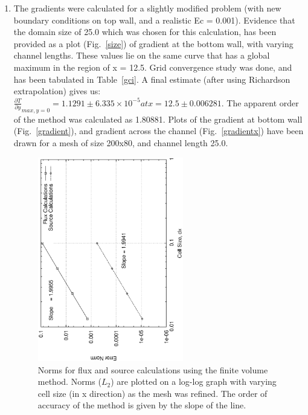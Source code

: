 \documentclass[a4paper,10pt]{article}
\begin{document}
\begin{enumerate}[I]
\item The gradients were calculated for a slightly modified problem (with new boundary conditions on top wall, and a realistic Ec = 0.001). Evidence that the domain size of 25.0 which was chosen for this calculation, has been provided as a plot (Fig.~\ref{size}) of gradient at the bottom wall, with varying channel lengths. These values lie on the same curve that has a global maximum in the region of x = 12.5. Grid convergence study was done, and has been tabulated in Table~\ref{gci}. A final estimate (after using Richardson extrapolation) gives us: $\frac{\partial T}{\partial y}_{max, y = 0} = 1.1291 \pm 6.335 \times 10^{-5} at x = 12.5 \pm 0.006281$. The apparent order of the method was calculated as 1.80881. Plots of the gradient at bottom wall (Fig.~\ref{gradient}), and gradient across the channel (Fig.~\ref{gradientx}) have been drawn for a mesh of size 200x80, and channel length 25.0.


\begin{figure}
  \centering
  \includegraphics[width=0.6\textwidth, angle = -90]{../plots/norm/norm.eps}
  \caption{Norms for flux and source calculations using the finite volume method. Norms ($L_2$) are plotted on a log-log graph with varying cell size (in x direction) as the mesh was refined. The order of accuracy of the method is given by the slope of the line.}
  \label{norms}
\end{figure}


\end{enumerate}
\end{document}
